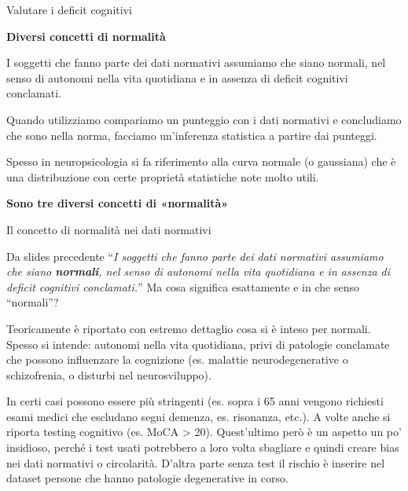 \documentclass[
  ignorenonframetext,
  aspectratio=169,
]{beamer}
\begin{document}
\begin{frame}{Valutare i deficit cognitivi}
\label{valutare-i-deficit-cognitivi-5}
\begin{center}
  \textbf{Diversi concetti di normalità}
\end{center}

I soggetti che fanno parte dei dati normativi assumiamo che siano
normali, nel senso di autonomi nella vita quotidiana e in assenza di
deficit cognitivi conclamati.

Quando utilizziamo compariamo un punteggio con i dati normativi e
concludiamo che sono nella norma, facciamo un'inferenza statistica a
partire dai punteggi.

Spesso in neuropsicologia si fa riferimento alla curva normale (o
gaussiana) che è una distribuzione con certe proprietà statistiche note
molto utili.

\begin{center}
  \textbf{Sono tre diversi concetti di «normalità»}
\end{center}
\end{frame}

\begin{frame}{Il concetto di normalità nei dati normativi}
\label{il-concetto-di-normalituxe0-nei-dati-normativi}
\small

Da slides precedente ``\emph{I soggetti che fanno parte dei dati
normativi assumiamo che siano \textbf{normali}, nel senso di autonomi
nella vita quotidiana e in assenza di deficit cognitivi conclamati.}''
Ma cosa significa esattamente e in che senso ``normali''?

Teoricamente è riportato con estremo dettaglio cosa si è inteso per
normali. Spesso si intende: autonomi nella vita quotidiana, privi di
patologie conclamate che possono influenzare la cognizione (es. malattie
neurodegenerative o schizofrenia, o disturbi nel neurosviluppo).

In certi casi possono essere più stringenti (es. sopra i 65 anni vengono
richiesti esami medici che escludano segni demenza, es. risonanza,
etc.). A volte anche si riporta testing cognitivo (es. MoCA
\textgreater{} 20). Quest'ultimo però è un aspetto un po' insidioso,
perché i test usati potrebbero a loro volta sbagliare e quindi creare
bias nei dati normativi o circolarità. D'altra parte senza test il
rischio è inserire nel dataset persone che hanno patologie degenerative
in corso.
\end{frame}
\end{document}

